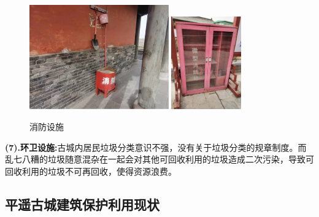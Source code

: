 \documentclass[UTF8]{ctexart}
\begin{document}
\begin{figure}[H]
    \centering
    \includegraphics[width=6cm]{图片 15.png}
    \includegraphics[width=3cm]{图片 17.png}
    \caption{消防设施}
    \label{fig:my_label}
\end{figure}
\textbf{(7).环卫设施:}古城内居民垃圾分类意识不强，没有关于垃圾分类的规章制度。而乱七八糟的垃圾随意混杂在一起会对其他可回收利用的垃圾造成二次污染，导致可回收利用的垃圾不可再回收，使得资源浪费。

    \subsection{平遥古城建筑保护利用现状}
\end{document}
